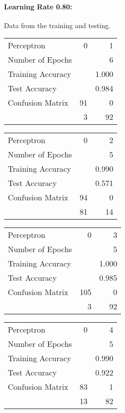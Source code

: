 \documentclass[11pt]{article}
\begin{document}
\paragraph{Learning Rate 0.80:}Data from the training and testing.\\
\begin{minipage}[t]{0.5\textwidth}
\begin{tabular}{|l | r r|}
\hline Perceptron & 0 & 1\\
Number of Epochs & & 6\\
Training Accuracy & & 1.000\\
Test Accuracy & & 0.984\\
Confusion Matrix & 91 & 0\\
 &3 & 92\\ \hline
\end{tabular}
\end{minipage}
\begin{minipage}[t]{0.5\textwidth}
\begin{tabular}{|l | r r|}
\hline Perceptron & 0 & 2\\
Number of Epochs & & 5\\
Training Accuracy & & 0.990\\
Test Accuracy & & 0.571\\
Confusion Matrix & 94 & 0\\
 &81 & 14\\ \hline
\end{tabular}
\end{minipage}
\begin{minipage}[t]{0.5\textwidth}
\begin{tabular}{|l | r r|}
\hline Perceptron & 0 & 3\\
Number of Epochs & & 5\\
Training Accuracy & & 1.000\\
Test Accuracy & & 0.985\\
Confusion Matrix & 105 & 0\\
 &3 & 92\\ \hline
\end{tabular}
\end{minipage}
\begin{minipage}[t]{0.5\textwidth}
\begin{tabular}{|l | r r|}
\hline Perceptron & 0 & 4\\
Number of Epochs & & 5\\
Training Accuracy & & 0.990\\
Test Accuracy & & 0.922\\
Confusion Matrix & 83 & 1\\
 &13 & 82\\ \hline
\end{tabular}
\end{minipage}
\end{document}
